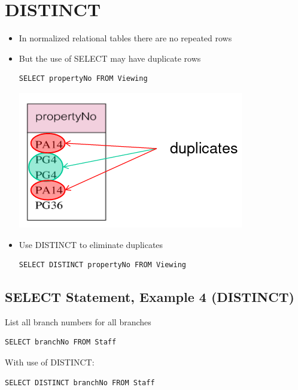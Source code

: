\documentclass{article}[18pt]
\begin{document}
\section{DISTINCT}
\begin{itemize}
	\item In normalized relational tables there are no repeated rows
	\item But the use of SELECT may have duplicate rows
	\begin{verbatim}
SELECT propertyNo FROM Viewing
	\end{verbatim}
\begin{center}
	\includegraphics[scale=0.7]{duplicate}
\end{center}
\item Use DISTINCT to eliminate duplicates
\begin{verbatim}
SELECT DISTINCT propertyNo FROM Viewing
\end{verbatim}
\end{itemize}
\subsection{SELECT Statement, Example 4 (DISTINCT)}
List all branch numbers for all branches
\begin{verbatim}
SELECT branchNo FROM Staff
\end{verbatim}
With use of DISTINCT:
\begin{verbatim}
SELECT DISTINCT branchNo FROM Staff
\end{verbatim}
\end{document}
